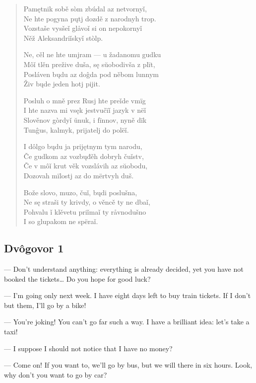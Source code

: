 \begin{verse}
	Pamętnik sobě sòm zbúdal az netvornyǐ, \\
	Ne hte pogyna pųtj dozdě z narodnyh trop. \\	
	Vozstaše vysšeǐ glåvoǐ si on nepokornyǐ \\
	Něž Aleksandriǐskyǐ stòlp.
	
	Ne, cěl ne hte umjram — u žadanomu gudku \\	
	Môǐ tlěn prežive duša, sę sŭobodivša z plït, \\	
	Posláven bųdu az doĝda pod něbom lunnym \\
	Živ bųde jeden hotj pijit.
		
	Posluh o mně prez Rusj hte preǐde vmïg \\	
	I hte nazva mi vsęk jestvučïǐ jazyk v nëǐ \\	
	Slověnov gòrdyǐ ŭnuk, i fïnnov, nyně dïk \\	
	Tunĝus, kalmyk, prijatelj do polëǐ.
	
	I dôlgo bųdu ja prijętnym tym narodu, \\	
	Če gudkom az vozbųđěh dobryh čuǐstv, \\	
	Če v môǐ krut věk vozslávih az sŭobodu, \\	
	Dozovah mïlostj az do mërtvyh duš.
	
	Bože slovo, muzo, čuǐ, bųdi poslušna, \\	
	Ne sę straši ty krivdy, o věncě ty ne dbaǐ, \\	
	Pohvalu ǐ klěvetu priǐmaǐ ty råvnodušno \\	
	I so glupakom ne spëraǐ.
\end{verse}

\subsection{Dvôgovor 1}

— Don’t understand anything: everything is already decided, yet you have not booked the tickets… Do you hope for good luck?

— I’m going only next week. I have eight days left to buy train tickets. If I don’t but them, I’ll go by a bike!

— You’re joking! You can’t go far such a way. I have a brilliant idea: let’s take a taxi!

— I suppose I should not notice that I have no money?

— Come on! If you want to, we’ll go by bus, but we will there in six hours. Look, why don’t you want to go by car?

